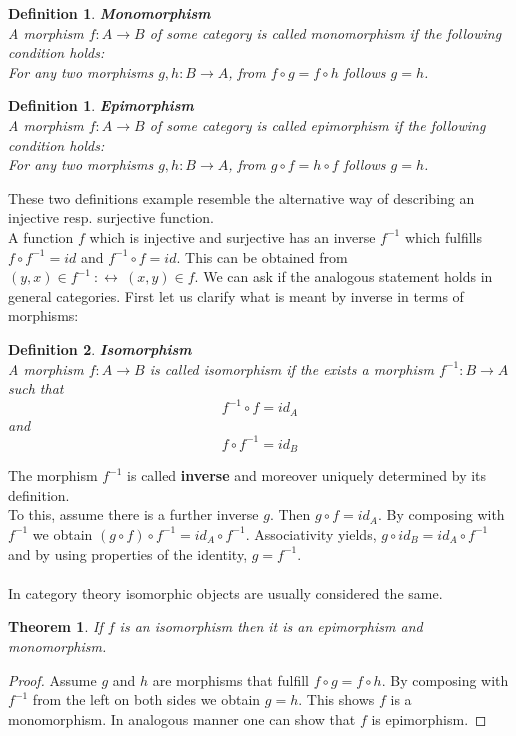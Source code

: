\documentclass[17pt]{extarticle}
\newtheorem{definition}{Definition}
\newtheorem*{definition*}{Definition}
\newtheorem*{theorem*}{Theorem}
\begin{document}
\begin{definition*}
	\textbf{Monomorphism}\\
	A morphism $f:A\rightarrow B$ of some category is called monomorphism if the following condition holds:\\
	For any two morphisms $g,h:B\rightarrow A$, from $f\circ g=f\circ h$ follows $g=h$.	
\end{definition*}

\begin{definition}
	\textbf{Epimorphism}\\
	A morphism $f:A\rightarrow B$ of some category is called epimorphism if the following condition holds:\\
	For any two morphisms $g,h:B\rightarrow A$, from $g\circ f=h\circ f$ follows $g=h$.	
\end{definition}

These two definitions example resemble the alternative way of describing an injective resp. surjective function.\\

A function $f$ which is injective and surjective has an inverse $f^{-1}$ which fulfills $f\circ f^{-1}=id$ and $f^{-1}\circ f=id$. This can be obtained from $(y,x)\in f^{-1} \ :\leftrightarrow \ (x,y)\in f$. We can ask if the analogous statement holds in general categories. First let us clarify what is meant by inverse in terms of morphisms:

\begin{definition*}
	\textbf{Isomorphism}\\
	A morphism $f:A\rightarrow B$ is called isomorphism if the exists a morphism $f^{-1}:B\rightarrow A$ such that
	$$f^{-1}\circ f=id_A$$
	and
	$$f\circ f^{-1}=id_B$$	
\end{definition*}

The morphism $f^{-1}$ is called \textbf{inverse} and moreover uniquely determined by its definition.\\
To this, assume there is a further inverse $g$.
Then $g\circ f=id_A$. By composing with $f^{-1}$ we obtain $(g\circ f)\circ f^{-1}=id_A\circ f^{-1}$.
Associativity yields, $g\circ id_B=id_A \circ f^{-1}$ and by using properties of the identity, $g=f^{-1}$.\\ \\
In category theory isomorphic objects are usually considered the same. 

\begin{theorem*}
	If $f$ is an isomorphism then it is an epimorphism and monomorphism.
\end{theorem*}
\begin{proof}
	Assume $g$ and $h$ are morphisms that fulfill $f\circ g=f\circ h$. By composing with $f^{-1}$ from the left on
	both sides we obtain $g=h$. This shows $f$ is a monomorphism. In analogous manner one can show that $f$
	is epimorphism.
\end{proof}
\end{document}
